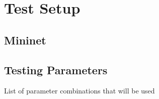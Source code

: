 \chapter{Test Setup}

\section{Mininet}

\section{Testing Parameters}
List of parameter combinations that will be used